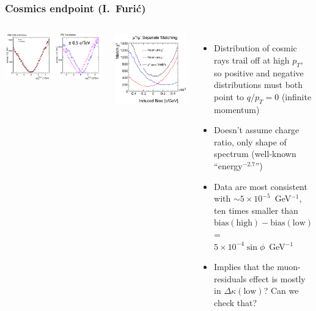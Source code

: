\documentclass[compress]{beamer}
\begin{document}
\begin{frame}
\frametitle{Cosmics endpoint {\normalsize (I.~Furi\'c)}}

\begin{columns}
\includegraphics[width=\linewidth]{ivan_cosmic_endpoint.png}

\includegraphics[width=0.7\linewidth]{ivan_chi2.png}
\begin{itemize}
\item Distribution of cosmic rays trail off at high $p_T$, so positive
  and negative distributions must both point to $q/p_T = 0$ (infinite momentum)

\item Doesn't assume charge ratio, only shape of spectrum (well-known ``energy$^{-2.7}$'')

\item Data are most consistent with $\sim 5\times 10^{-5}$~GeV$^{-1}$, ten times
  smaller than $\mbox{bias}(\mbox{high}) - \mbox{bias}(\mbox{low})$ = \\ \hfill $5\times 10^{-4} \sin\phi$~GeV$^{-1}$

\item Implies that the muon-residuals effect is mostly in $\Delta \kappa(\mbox{low})$?  Can we check that?

\end{itemize}
\end{columns}
\end{frame}
\end{document}
